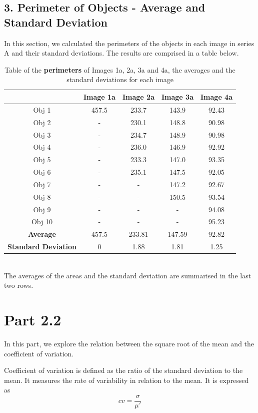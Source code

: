 \documentclass[runningheads]{llncs}
\begin{document}
\subsection*{3. Perimeter of Objects - Average and Standard Deviation}
In this section, we calculated the perimeters of the objects in each image in series A and their standard deviations. 
The results are comprised in a table below. 
\begin{table}[h!]
\centering
\begin{tabular}{|c|c|c|c|c|}
\hline
\textbf{} & \textbf{Image 1a} & \textbf{Image 2a} & \textbf{Image 3a} & \textbf{Image 4a} \\
\hline
Obj 1 & 457.5 & 233.7  & 143.9 & 92.43 \\ \hline
Obj 2 &  -     & 230.1  & 148.8 & 90.98 \\ \hline
Obj 3 &  -     & 234.7  & 148.9 & 90.98 \\ \hline
Obj 4 &  -     & 236.0  & 146.9 & 92.92 \\ \hline
Obj 5 &  -     & 233.3  & 147.0 & 93.35 \\ \hline
Obj 6 &  -     & 235.1  & 147.5 & 92.05 \\ \hline
Obj 7 &  -     &   -     & 147.2 & 92.67 \\ \hline
Obj 8 &   -    &   -     & 150.5 & 93.54 \\ \hline
Obj 9 &  -     &    -    &   -    & 94.08  \\ \hline
Obj 10 & -      &  -      &   -   & 95.23  \\ \hline
\textbf{Average} &    457.5   &  233.81      &  147.59     & 92.82  \\ \hline
\textbf{Standard Deviation} &   0    &    1.88    &  1.81     & 1.25 \\ \hline
\end{tabular}
\caption{Table of the \textbf{perimeters} of Images 1a, 2a, 3a and 4a, the averages and the standard deviations for each image}
\label{tab:Perimeter-ImageSeriesA}
\end{table}
\\ The averages of the areas and the standard deviation are summarised in the last two rows. 
\newpage
\section*{Part 2.2}
In this part, we explore the relation between the square root of the mean and the coefficient of variation. 
\par Coefficient of variation is defined as the ratio of the standard deviation to the mean. It measures the rate of variability in relation to the mean.
It is expressed as 
\begin{equation*}
    cv = \frac{\sigma}{\mu'}
\end{equation*}
\end{document}
